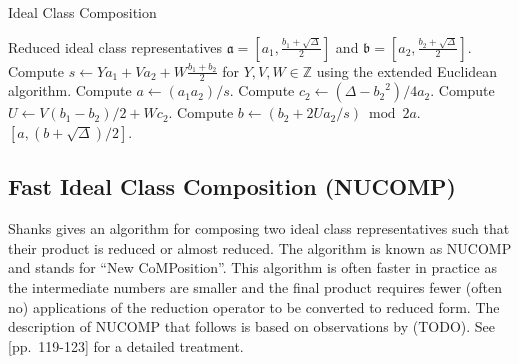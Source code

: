 \documentclass{ucalgthes1}
\theoremstyle{plain}
\theoremstyle{definition}
\newcommand{\ZZ}{\mathbb{Z}}
\begin{document}
\begin{algorithm}[h!]
\caption{Ideal Class Composition}
\label{alg:idealCompose}
\begin{algorithmic}[1]
\REQUIRE Reduced ideal class representatives $\mathfrak a = \left[a_1, \frac{b_1 + \sqrt\Delta}{2}\right]$ and $\mathfrak b = \left[a_2, \frac{b_2 + \sqrt\Delta}{2}\right]$.
\STATE Compute $s \leftarrow Ya_1 + Va_2 + W\frac{b_1+b_2}{2}$ for $Y, V, W \in \ZZ$ using the extended Euclidean algorithm.
\STATE Compute $a \leftarrow (a_1a_2)/s$.
\STATE Compute $c_2 \leftarrow (\Delta-{b_2}^2)/4a_2$.
\STATE Compute $U \leftarrow V(b_1-b_2)/2 + Wc_2$.
\STATE Compute $b \leftarrow (b_2 + 2Ua_2/s) \bmod{2a}$.
\RETURN $[a, (b + \sqrt\Delta)/2]$.
\end{algorithmic}
\end{algorithm}

\subsection{Fast Ideal Class Composition (NUCOMP)}
\label{subsec:nucomp}
Shanks gives an algorithm for composing two ideal class representatives such that their product is reduced or almost reduced.  The algorithm is known as NUCOMP and stands for ``New CoMPosition''.  This algorithm is often faster in practice as the intermediate numbers are smaller and the final product requires fewer (often no) applications of the reduction operator to be converted to reduced form.  The description of NUCOMP that follows is based on observations by (TODO).  See \cite{Jac09}[pp.~119-123] for a detailed treatment.
\end{document}
